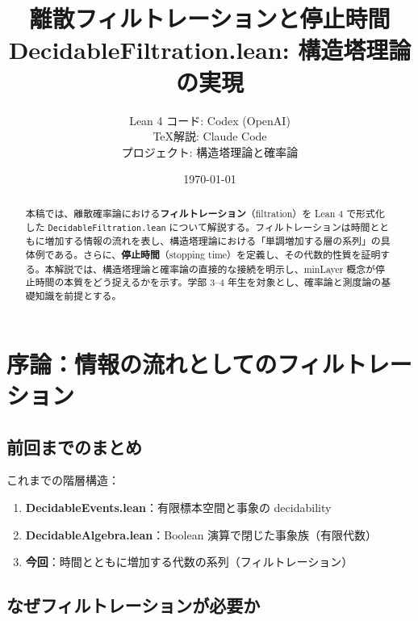 \documentclass[12pt,a4paper,ja=standard]{bxjsarticle}
\title{\Huge\bfseries 離散フィルトレーションと停止時間\\
\Large DecidableFiltration.lean: 構造塔理論の実現}
\author{
    \large Lean 4 コード: Codex (OpenAI) \\
    \large \TeX 解説: Claude Code \\
    \vspace{0.3cm}
    \normalsize プロジェクト: 構造塔理論と確率論
}
\date{\today}
\theoremstyle{definition}
\begin{document}
\maketitle

\begin{abstract}
本稿では、離散確率論における\textbf{フィルトレーション}（filtration）を Lean 4 で形式化した \texttt{DecidableFiltration.lean} について解説する。フィルトレーションは時間とともに増加する情報の流れを表し、構造塔理論における「単調増加する層の系列」の具体例である。さらに、\textbf{停止時間}（stopping time）を定義し、その代数的性質を証明する。本解説では、構造塔理論と確率論の直接的な接続を明示し、minLayer 概念が停止時間の本質をどう捉えるかを示す。学部 3--4 年生を対象とし、確率論と測度論の基礎知識を前提とする。
\end{abstract}

\tableofcontents
\newpage

\section{序論：情報の流れとしてのフィルトレーション}

\subsection{前回までのまとめ}

これまでの階層構造：

\begin{enumerate}
    \item \textbf{DecidableEvents.lean}：有限標本空間と事象の decidability
    \item \textbf{DecidableAlgebra.lean}：Boolean 演算で閉じた事象族（有限代数）
    \item \textbf{今回}：時間とともに増加する代数の系列（フィルトレーション）
\end{enumerate}

\subsection{なぜフィルトレーションが必要か}
\end{document}
